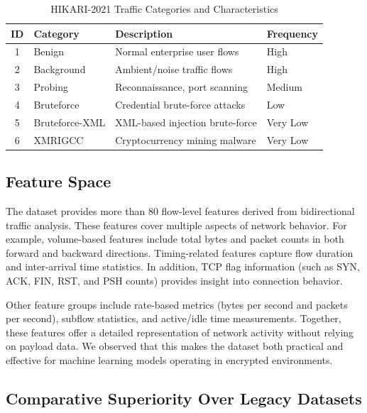 \documentclass[conference]{IEEEtran}
\begin{document}
\begin{table}[h]
\centering
\caption{HIKARI-2021 Traffic Categories and Characteristics}
\label{tab:hikari_classes}
\begin{tabular}{clll}
\hline
\textbf{ID} & \textbf{Category} & \textbf{Description} & \textbf{Frequency} \\
\hline
1 & Benign          & Normal enterprise user flows           & High     \\
2 & Background      & Ambient/noise traffic flows            & High     \\
3 & Probing         & Reconnaissance, port scanning          & Medium   \\
4 & Bruteforce      & Credential brute-force attacks         & Low      \\
5 & Bruteforce-XML  & XML-based injection brute-force        & Very Low \\
6 & XMRIGCC         & Cryptocurrency mining malware          & Very Low \\
\hline
\end{tabular}
\end{table}

\subsection{Feature Space}

The dataset provides more than 80 flow-level features derived from bidirectional traffic analysis. These features cover multiple aspects of network behavior. For example, volume-based features include total bytes and packet counts in both forward and backward directions. Timing-related features capture flow duration and inter-arrival time statistics. In addition, TCP flag information (such as SYN, ACK, FIN, RST, and PSH counts) provides insight into connection behavior.

Other feature groups include rate-based metrics (bytes per second and packets per second), subflow statistics, and active/idle time measurements. Together, these features offer a detailed representation of network activity without relying on payload data. We observed that this makes the dataset both practical and effective for machine learning models operating in encrypted environments.

\subsection{Comparative Superiority Over Legacy Datasets}
\end{document}
